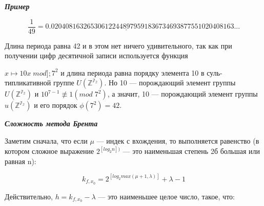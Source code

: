 \noindent\slshape{\textbf{Пример}} \par 
{} \par 
$$\frac{1}{49} = 0.\underline{020408163265306122448979591836734693877551}020408163...$$ \par 
\indent Длина периода равна 42 и в этом нет ничего удивительного, так как при \linebreak получении цифр десятичной записи используется функция \linebreak\newpage 


\noindent$x \mapsto 10x \; mod]; 7^{2}$ и длина периода равна порядку элемента 10 в суль- \linebreak типликативной группе $U(\mathbb{Z^{7_{2}}})$. Но 10 --- порождающий элемент \linebreak группы $U(\mathbb{Z^{7_{2}}})$ и $10^{7-1} \not\equiv 1 (mod \; 7^{2})$, а значит, 10 --- порождающий элемент \linebreak группы $u(\mathbb{Z^{7_{2}}})$ и его порядок $\phi(7^{2}) = 42$. \par 

\noindent\slshape{\textbf{Сложность метода Брента}} \par 
{} \par 
Заметим сначала, что если $\mu$  --- индек с вхождения, то выполняется \linebreak равенство (в котором сложное выражение $2^{[log_{2}n])}$ --- это наименьшая \linebreak степень 2б большая или равная n): \par 
$$k_{f,x_{0}} = 2^{[log_{2}max(\mu+1,\lambda)]} + \lambda - 1$$ \par 
\noindent Действительно, $h = k_{f,x_{0}} - \lambda$ --- это наименьшее целое число, такое, что: \par 

